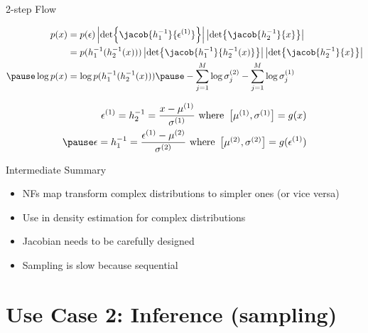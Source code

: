 \documentclass[14pt]{beamer}
\begin{document}
\begin{frame}{2-step Flow}
\begin{small}
\begin{equation*}
\begin{aligned}
p(x) &= p(\epsilon)\abs{\det\jacob{h_{1}^{-1}}{\epsilon^{(1)}}}\abs{\det\jacob{h_{2}^{-1}}{x}} \\
&= p(h_{1}^{-1}(h_{2}^{-1}(x)))\abs{\det\jacob{h_{1}^{-1}}{h_{2}^{-1}(x)}}\abs{\det\jacob{h_{2}^{-1}}{x}} \\ \pause
\log p(x) &= \log p(h_{1}^{-1}(h_{2}^{-1}(x)))\pause -\sum_{j=1}^{M}\log\sigma^{(2)}_{j}-\sum_{j=1}^{M}\log\sigma^{(1)}_{j}
\end{aligned}
\end{equation*}
\end{small}
\pause
\begin{equation*}
\begin{aligned}
\epsilon^{(1)} = h^{-1}_{2} = \frac{x - \mu^{(1)}}{\sigma^{(1)}} \text{ where } \begin{bmatrix}\mu^{(1)}, \sigma^{(1)}\end{bmatrix} = g(x) \\ \pause
\epsilon = h^{-1}_{1} = \frac{\epsilon^{(1)} - \mu^{(2)}}{\sigma^{(2)}} \text{ where } \begin{bmatrix}\mu^{(2)}, \sigma^{(2)}\end{bmatrix} = g(\epsilon^{(1)})
\end{aligned}
\end{equation*}
\end{frame}

\begin{frame}{Intermediate Summary}
\begin{itemize}
\item NFs map transform complex distributions to simpler ones (or vice versa)
\item Use in density estimation for complex distributions
\item Jacobian needs to be carefully designed
\item Sampling is slow because sequential
\end{itemize}
\end{frame}

\section{Use Case 2: Inference (sampling)}
\begin{frame}
\tableofcontents[current]
\end{frame}
\end{document}
